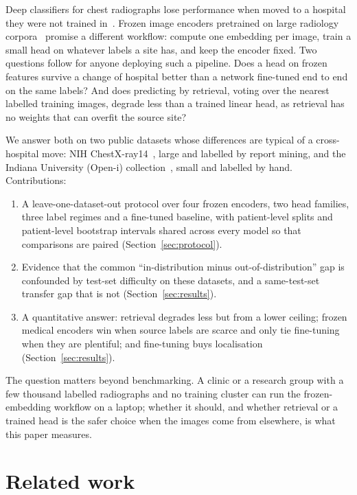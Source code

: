 \documentclass[conference]{IEEEtran}
\begin{document}
Deep classifiers for chest radiographs lose performance when moved to a hospital they were not trained in~\cite{zech2018,pooch2020}. Frozen image encoders pretrained on large radiology corpora~\cite{perezgarcia2025,zhang2025biomedclip} promise a different workflow: compute one embedding per image, train a small head on whatever labels a site has, and keep the encoder fixed. Two questions follow for anyone deploying such a pipeline. Does a head on frozen features survive a change of hospital better than a network fine-tuned end to end on the same labels? And does predicting by retrieval, voting over the nearest labelled training images, degrade less than a trained linear head, as retrieval has no weights that can overfit the source site?

We answer both on two public datasets whose differences are typical of a cross-hospital move: NIH ChestX-ray14~\cite{wang2017}, large and labelled by report mining, and the Indiana University (Open-i) collection~\cite{demnerfushman2016}, small and labelled by hand. Contributions:
\begin{enumerate}
  \item A leave-one-dataset-out protocol over four frozen encoders, two head families, three label regimes and a fine-tuned baseline, with patient-level splits and patient-level bootstrap intervals shared across every model so that comparisons are paired (Section~\ref{sec:protocol}).
  \item Evidence that the common ``in-distribution minus out-of-distribution'' gap is confounded by test-set difficulty on these datasets, and a same-test-set transfer gap that is not (Section~\ref{sec:results}).
  \item A quantitative answer: retrieval degrades less but from a lower ceiling; frozen medical encoders win when source labels are scarce and only tie fine-tuning when they are plentiful; and fine-tuning buys localisation (Section~\ref{sec:results}).
\end{enumerate}
The question matters beyond benchmarking. A clinic or a research group with a few thousand labelled radiographs and no training cluster can run the frozen-embedding workflow on a laptop; whether it should, and whether retrieval or a trained head is the safer choice when the images come from elsewhere, is what this paper measures.

\section{Related work}
\end{document}
